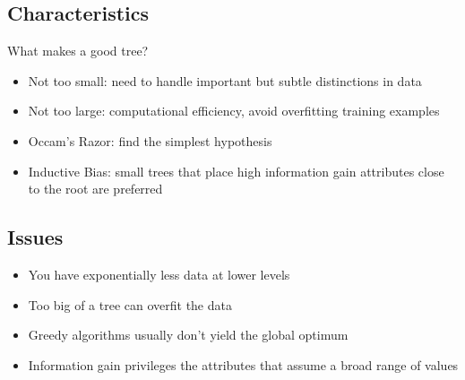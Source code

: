 \subsection{Characteristics}
What makes a good tree?
\begin{itemize}
    \item Not too small: need to handle important but subtle distinctions in data
    \item Not too large: computational efficiency, avoid overfitting training examples
    \item Occam's Razor: find the simplest hypothesis
    \item Inductive Bias: small trees that place high information gain attributes
    close to the root are preferred
\end{itemize}

\subsection{Issues}
\begin{itemize}
    \item You have exponentially less data at lower levels
    \item Too big of a tree can overfit the data
    \item Greedy algorithms usually don't yield the global optimum
    \item Information gain privileges the attributes that assume a broad range of values
\end{itemize}

\newpage